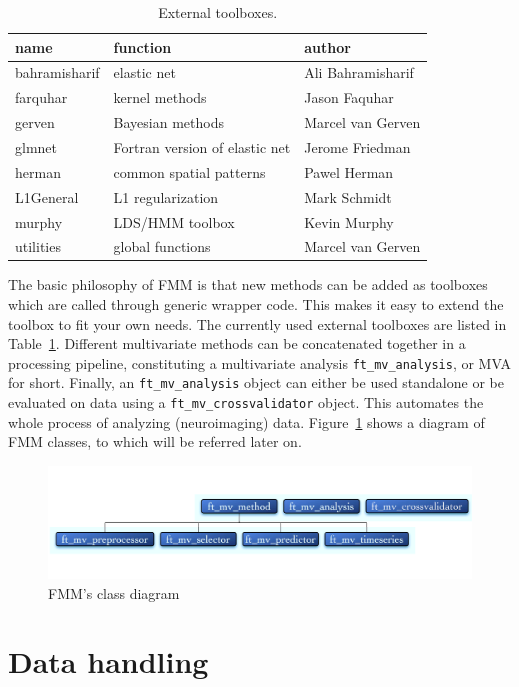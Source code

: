 \documentclass{article}
\renewcommand{\t}[1]{{\tt #1}}
\begin{document}
\begin{table}[ht]
\centering
\caption{External toolboxes.}
\begin{tabular}{l|l|l}
{\bf name} & {\bf function} & {\bf author}\\
\hline
bahramisharif & elastic net & Ali Bahramisharif  \\
farquhar & kernel methods & Jason Faquhar\\
gerven & Bayesian methods & Marcel van Gerven\\
glmnet & Fortran version of elastic net & Jerome Friedman\\
herman & common spatial patterns & Pawel Herman\\
L1General & L1 regularization & Mark Schmidt\\
murphy & LDS/HMM toolbox & Kevin Murphy\\
utilities & global functions & Marcel van Gerven
\end{tabular}
\label{tab:external}
\end{table}


The basic philosophy of FMM is that new methods can be added as toolboxes which are called through generic wrapper code. This makes it easy to extend the toolbox to fit your own needs. The currently used external toolboxes are listed in Table~\ref{tab:external}. Different multivariate methods can be concatenated together in a processing pipeline, constituting a multivariate analysis \t{ft\_mv\_analysis}, or MVA for short. Finally, an \t{ft\_mv\_analysis} object can either be used standalone or be evaluated on data using a \t{ft\_mv\_crossvalidator} object. This automates the whole process of analyzing (neuroimaging) data. Figure~\ref{class} shows a diagram of FMM classes, to which will be referred later on. 

\begin{figure}[ht]
\begin{center}
\includegraphics[width=\textwidth]{figures/classes.pdf}
\caption{FMM's class diagram}
\end{center}
\label{class}
\end{figure}

\section{Data handling}
\end{document}
